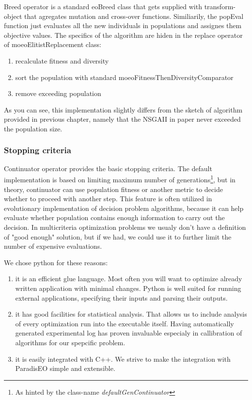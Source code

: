 \documentclass[12pt,oneside,draft]{fithesis2}
\begin{document}
Breed operator is a standard eoBreed class that gets supplied with transform-object that agregates mutation and cross-over functions. Similiarily, the popEval function just evaluates all the new individuals in populations and assignes them objective values. The specifics of the algorithm are hiden in the replace operator of moeoElitistReplacement class:
\begin{enumerate}
\item recalculate fitness and diversity
\item sort the population with standard moeoFitnessThenDiversityComparator
\item remove exceeding population
\end{enumerate}

As you can see, this implementation slightly differs from the sketch of algorithm provided in previous chapter, namely that the NSGAII in paper never exceeded the population size.

\subsubsection{Stopping criteria}
Continuator operator provides the basic stopping criteria. The default implementation is based on limiting maximum number of generations\footnote{As hinted by the class-name \emph{defaultGenContinuator}}, but in theory, continuator can use population fitness or another metric to decide whether to proceed with another step. This feature is often utilized in evolutionary implementation of decision problem algorithms, because it can help evaluate whether population contains enough information to carry out the decision. In multicriteria optimization problems we usualy don't have a definition of "good enough" solution, but if we had, we could use it to further limit the number of expensive evaluations.

We chose python for these reasons:
\begin{enumerate}
\item it is an efficient glue language. 
Most often you will want to optimize already written application with minimal changes. Python is well suited for running external applications, specifying their inputs and parsing their outputs.
 
\item it has good facilities for statistical analysis.
That allows us to include analysis of every optimization run into the executable itself. Having automatically generated experimental log has proven invaluable especialy in callibration of algorithms for our spepcific problem.

\item it is easily integrated with C++.
We strive to make the integration with ParadisEO simple and extensible. 
\end{enumerate}
\end{document}
